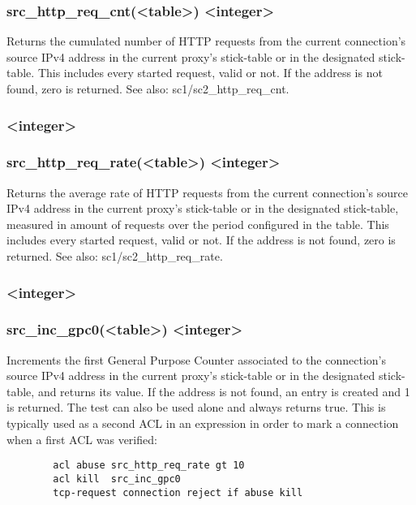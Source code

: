 \subsubsection*{src\_http\_req\_cnt(<table>) <integer>}
  Returns the cumulated number of HTTP requests from the current connection's
  source IPv4 address in the current proxy's stick-table or in the designated
  stick-table. This includes every started request, valid or not. If the
  address is not found, zero is returned.
See also: sc1/sc2\_http\_req\_cnt.

\subsubsection[src\_http\_req\_rate]{ <integer>}
\subsubsection*{src\_http\_req\_rate(<table>) <integer>}
  Returns the average rate of HTTP requests from the current connection's
  source IPv4 address in the current proxy's stick-table or in the designated
  stick-table, measured in amount of requests over the period configured in the
  table. This includes every started request, valid or not. If the address is
  not found, zero is returned.
See also: sc1/sc2\_http\_req\_rate.

\subsubsection[src\_inc\_gpc0]{ <integer>}
\subsubsection*{src\_inc\_gpc0(<table>) <integer>}
  Increments the first General Purpose Counter associated to the connection's
  source IPv4 address in the current proxy's stick-table or in the designated
  stick-table, and returns its value. If the address is not found, an entry is
  created and 1 is returned. The test can also be used alone and always returns
  true. This is typically used as a second ACL in an expression in order to
  mark a connection when a first ACL was verified:
  \begin{verbatim}
        acl abuse src_http_req_rate gt 10
        acl kill  src_inc_gpc0
        tcp-request connection reject if abuse kill
  \end{verbatim}

